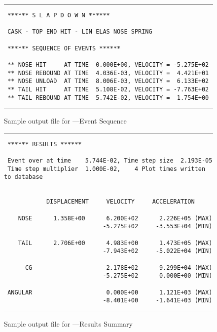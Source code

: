 \begin{figure}
\parskip0pt
\hrule\small
\begin{verbatim}
 ****** S L A P D O W N ******

 CASK - TOP END HIT - LIN ELAS NOSE SPRING 

 ****** SEQUENCE OF EVENTS ******

 ** NOSE HIT     AT TIME  0.000E+00, VELOCITY = -5.275E+02
 ** NOSE REBOUND AT TIME  4.036E-03, VELOCITY =  4.421E+01
 ** NOSE UNLOAD  AT TIME  8.006E-03, VELOCITY =  6.133E+02
 ** TAIL HIT     AT TIME  5.108E-02, VELOCITY = -7.763E+02
 ** TAIL REBOUND AT TIME  5.742E-02, VELOCITY =  1.754E+00
\end{verbatim}
\hrule
\caption{Sample output file for \SLAP---Event Sequence}\label{sampout3}
\end{figure}
\begin{figure}
\parskip0pt
\hrule\small
\begin{verbatim}
 ****** RESULTS ******

 Event over at time    5.744E-02, Time step size  2.193E-05
 Time step multiplier  1.000E-02,    4 Plot times written to database


            DISPLACEMENT     VELOCITY     ACCELERATION

    NOSE      1.358E+00      6.200E+02      2.226E+05 (MAX)
                            -5.275E+02     -3.553E+04 (MIN)

    TAIL      2.706E+00      4.983E+00      1.473E+05 (MAX)
                            -7.943E+02     -5.022E+04 (MIN)

      CG                     2.178E+02      9.299E+04 (MAX)
                            -5.275E+02      0.000E+00 (MIN)

 ANGULAR                     0.000E+00      1.121E+03 (MAX)
                            -8.401E+00     -1.641E+03 (MIN)
\end{verbatim}
\hrule
\caption{Sample output file for \SLAP---Results Summary}\label{sampout4}
\end{figure}


